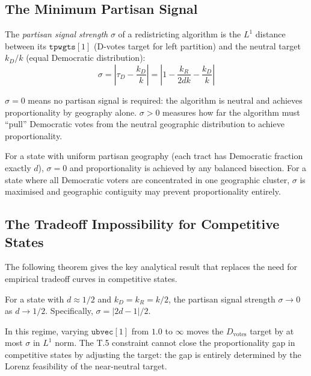 \subsection{The Minimum Partisan Signal}

\begin{definition}
The \emph{partisan signal strength} $\sigma$ of a redistricting algorithm is the
$L^1$ distance between its $\mathtt{tpwgts}[1]$ (D-votes target for left partition)
and the neutral target $k_D/k$ (equal Democratic distribution):
\[
  \sigma = \left|\tau_D - \frac{k_D}{k}\right| = \left|1 - \frac{k_R}{2dk} - \frac{k_D}{k}\right|
\]
\end{definition}

$\sigma = 0$ means no partisan signal is required: the algorithm is neutral
and achieves proportionality by geography alone.
$\sigma > 0$ measures how far the algorithm must ``pull'' Democratic votes
from the neutral geographic distribution to achieve proportionality.

\begin{proposition}
For a state with uniform partisan geography (each tract has Democratic fraction
exactly $d$), $\sigma = 0$ and proportionality is achieved by any balanced bisection.
For a state where all Democratic voters are concentrated in one geographic cluster,
$\sigma$ is maximised and geographic contiguity may prevent proportionality entirely.
\end{proposition}

\subsection{The Tradeoff Impossibility for Competitive States}

The following theorem gives the key analytical result that replaces the need
for empirical tradeoff curves in competitive states.

\begin{theorem}
\label{thm:invariance}
For a state with $d \approx 1/2$ and $k_D = k_R = k/2$, the partisan signal
strength $\sigma \to 0$ as $d \to 1/2$.
Specifically, $\sigma = |2d - 1| / 2$.

In this regime, varying $\mathtt{ubvec}[1]$ from $1.0$ to $\infty$ moves the
$D_{\text{votes}}$ target by at most $\sigma$ in $L^1$ norm.
The T.5 constraint cannot close the proportionality gap in competitive states
by adjusting the target: the gap is entirely determined by the Lorenz
feasibility of the near-neutral target.
\end{theorem}

